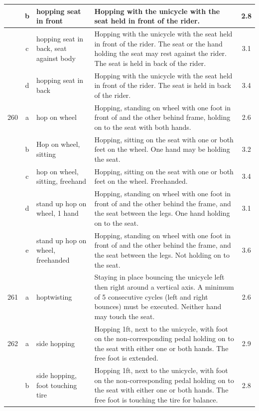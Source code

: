 \begin{longtable}{|r|c|p{4cm}|p{8cm}|c|}
  & b & hopping seat in front & Hopping with the unicycle with the seat held in front of the rider. & 2.8 \\ 
\hline
  & c & hopping seat in back, seat against body & Hopping with the unicycle with the seat held in front of the rider. The seat or the hand holding the seat may rest against the rider. The seat is held in back of the rider.  & 3.1 \\ 
\hline
  & d & hopping seat in back  & Hopping with the unicycle with the seat held in front of the rider. The seat is held in back of the rider.  & 3.4 \\ 
\hline
260 & a & hop on wheel  & Hopping, standing on wheel with one foot in front of and the other behind frame, holding on to the seat with both hands.  & 2.6 \\ 
\hline
  & b & Hop on wheel, sitting & Hopping, sitting on the seat with one or both feet on the wheel. One hand may be holding the seat.  & 3.2 \\ 
\hline
  & c & hop on wheel, sitting, freehand & Hopping, sitting on the seat with one or both feet on the wheel. Freehanded.  & 3.4 \\ 
\hline
  & d & stand up hop on wheel, 1 hand & Hopping, standing on wheel with one foot in front of and the other behind the frame, and the seat between the legs. One hand holding on to the seat.  & 3.1 \\ 
\hline
  & e & stand up hop on wheel, freehanded & Hopping, standing on wheel with one foot in front of and the other behind the frame, and the seat between the legs. Not holding on to the seat. & 3.6 \\ 
\hline
261 & a & hoptwisting & Staying in place bouncing the unicycle left then right around a vertical axis. A minimum of 5 consecutive cycles (left and right bounces) must be executed. Neither hand may touch the seat.  & 2.6 \\ 
\hline
262 & a & side hopping  & Hopping 1ft, next to the unicycle, with foot on the non-corresponding pedal holding on to the seat with either one or both hands. The free foot is extended.  & 2.9 \\ 
\hline
  & b & side hopping, foot touching tire  & Hopping 1ft, next to the unicycle, with foot on the non-corresponding pedal holding on to the seat with either one or both hands. The free foot is touching the tire for balance. & 2.8 \\ 
\hline
\end{longtable}
\newpage

